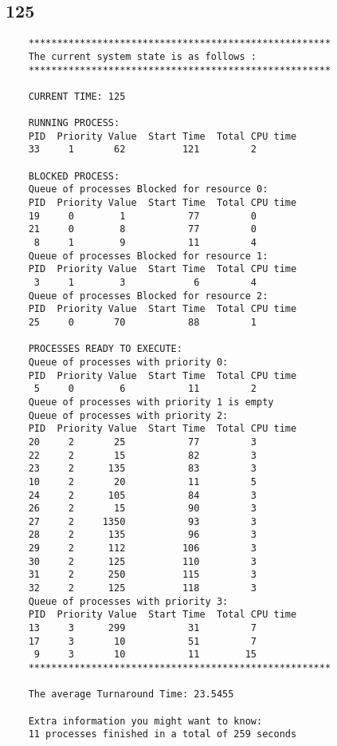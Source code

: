 \documentclass{article}
\begin{document}
\subsection*{125}
\begin{verbatim}
    *****************************************************
    The current system state is as follows : 
    *****************************************************
     
    CURRENT TIME: 125
    
    RUNNING PROCESS:
    PID  Priority Value  Start Time  Total CPU time
    33     1       62          121         2
    
    BLOCKED PROCESS:
    Queue of processes Blocked for resource 0:
    PID  Priority Value  Start Time  Total CPU time
    19     0        1           77         0
    21     0        8           77         0
     8     1        9           11         4
    Queue of processes Blocked for resource 1:
    PID  Priority Value  Start Time  Total CPU time
     3     1        3            6         4
    Queue of processes Blocked for resource 2:
    PID  Priority Value  Start Time  Total CPU time
    25     0       70           88         1
    
    PROCESSES READY TO EXECUTE:
    Queue of processes with priority 0:
    PID  Priority Value  Start Time  Total CPU time
     5     0        6           11         2
    Queue of processes with priority 1 is empty
    Queue of processes with priority 2:
    PID  Priority Value  Start Time  Total CPU time
    20     2       25           77         3
    22     2       15           82         3
    23     2      135           83         3
    10     2       20           11         5
    24     2      105           84         3
    26     2       15           90         3
    27     2     1350           93         3
    28     2      135           96         3
    29     2      112          106         3
    30     2      125          110         3
    31     2      250          115         3
    32     2      125          118         3
    Queue of processes with priority 3:
    PID  Priority Value  Start Time  Total CPU time
    13     3      299           31         7
    17     3       10           51         7
     9     3       10           11        15
    *****************************************************
    
    The average Turnaround Time: 23.5455
    
    Extra information you might want to know:
    11 processes finished in a total of 259 seconds    
\end{verbatim}
\end{document}
